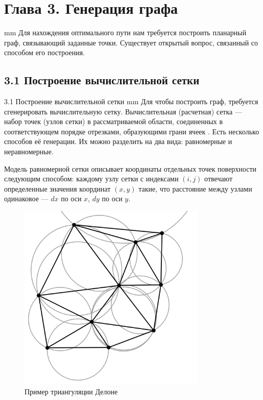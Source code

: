 \newpage
\section*{\LARGE{Глава 3. Генерация графа}}
 mm
Для нахождения оптимального пути нам требуется построить планарный граф, связывающий заданные точки. Существует открытый вопрос, связанный со способом его построения. 
\subsection*{\Large{3.1 Построение вычислительной сетки}}
 {3.1 Построение вычислительной сетки}
 mm
Для чтобы построить граф, требуется сгенерировать вычислительную сетку.
Вычислительная (расчетная) сетка --- набор точек (узлов сетки) в рассматриваемой области, соединенных в соответствующем порядке отрезками, образующими грани ячеек \cite{Mesh}. Есть несколько способов её генерации. Их можно разделить на два вида: равномерные и неравномерные. 
\par
Модель равномерной сетки описывает координаты отдельных точек поверхности следующим способом: каждому узлу сетки с индексами $\left(i,j\right)$ отвечают определенные значения координат $\left(x, y\right)$ такие, что расстояние между узлами одинаковое --- $dx$ по оси $x$, $dy$ по оси $y$. 
\par
\begin{figure}
	\begin{center}
		\includegraphics[width=0.8\textwidth]{images/3_0.png}
	\end{center}
	\caption{Пример триангуляции Делоне}
	\label{pic:delaunay_triangulation}
\end{figure} 
